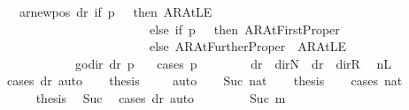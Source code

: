 \begin{isabellebody}
\ \ \ {\isachardoublequoteopen}{\isacharparenleft}{\kern0pt}ar{\isacharunderscore}{\kern0pt}newpos\ dr\ {\isacharparenleft}{\kern0pt}if\ p\ {\isacharequal}{\kern0pt}\ {}\ then\ AR{\isacharunderscore}{\kern0pt}AtLE\isanewline
\ \ \ \ \ \ \ \ \ \ \ \ \ \ \ \ \ \ \ \ \ \ \ \ else\ if\ p\ {\isacharequal}{\kern0pt}\ {}\ then\ AR{\isacharunderscore}{\kern0pt}AtFirstProper\isanewline
\ \ \ \ \ \ \ \ \ \ \ \ \ \ \ \ \ \ \ \ \ \ \ \ else\ AR{\isacharunderscore}{\kern0pt}AtFurtherProper{\isacharparenright}{\kern0pt}\ {\isacharequal}{\kern0pt}\ AR{\isacharunderscore}{\kern0pt}AtLE{\isacharparenright}{\kern0pt}\isanewline
\ \ \ \ \ \ \ \ \ \ \ {\isasymlongleftrightarrow}\ go{\isacharunderscore}{\kern0pt}dir\ dr\ p\ {\isacharequal}{\kern0pt}\ {}{\isachardoublequoteclose}\isanewline
%
\isadelimproof
%
\endisadelimproof
%
\isatagproof
{}\isamarkupfalse%
\ {\isacharparenleft}{\kern0pt}cases\ p{\isacharparenright}{\kern0pt}\isanewline
\ \ \isamarkupfalse%
\ {}\isanewline
\ \ \isamarkupfalse%
\ {\isachardoublequoteopen}dr\ {\isacharequal}{\kern0pt}\ dir{\isachardot}{\kern0pt}N\ {\isasymor}\ dr\ {\isacharequal}{\kern0pt}\ dir{\isachardot}{\kern0pt}R{\isachardoublequoteclose}\ \isamarkupfalse%
\ nL{}\ \isamarkupfalse%
\ {\isacharparenleft}{\kern0pt}cases\ dr{\isacharparenright}{\kern0pt}\ auto\isanewline
\ \ \isamarkupfalse%
\ {\isacharquery}{\kern0pt}thesis\ \isamarkupfalse%
\ {}\ \isamarkupfalse%
\ auto\isanewline
{}\isamarkupfalse%
\isanewline
\ \ \isamarkupfalse%
\ {\isacharparenleft}{\kern0pt}Suc\ nat{\isacharparenright}{\kern0pt}\isanewline
\ \ \isamarkupfalse%
\ {\isacharquery}{\kern0pt}thesis\isanewline
\ \ \isamarkupfalse%
\ {\isacharparenleft}{\kern0pt}cases\ nat{\isacharparenright}{\kern0pt}\isanewline
\ \ \ \ \isamarkupfalse%
\ {}\isanewline
\ \ \ \ \isamarkupfalse%
\ {\isacharquery}{\kern0pt}thesis\ \isamarkupfalse%
\ Suc\ \isamarkupfalse%
\ {\isacharparenleft}{\kern0pt}cases\ dr{\isacharparenright}{\kern0pt}\ auto\isanewline
\ \ \isamarkupfalse%
\isanewline
\ \ \ \ \isamarkupfalse%
\ {\isacharparenleft}{\kern0pt}Suc\ m{\isacharparenright}{\kern0pt}\isanewline
\ \ \ \ \isamarkupfalse%

\end{isabellebody}
